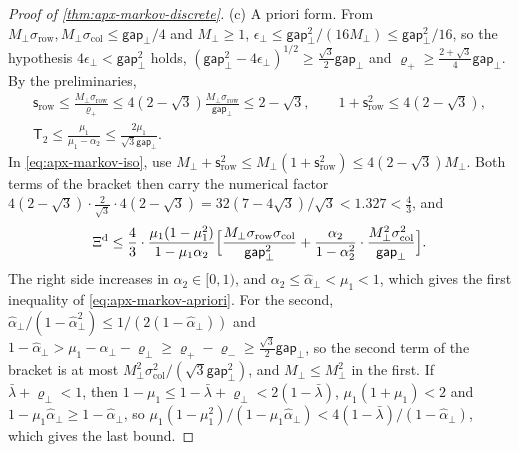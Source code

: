 \begin{proof}[Proof of \cref{thm:apx-markov-discrete}]
(c) A priori form. From $M_\perp\sigma_{\mathrm{row}},M_\perp\sigma_{\mathrm{col}}\le\mathsf{gap}_\perp/4$ and $M_\perp\ge1$, $\epsilon_\perp\le\mathsf{gap}_\perp^2/(16M_\perp)\le\mathsf{gap}_\perp^2/16$, so the hypothesis $4\epsilon_\perp<\mathsf{gap}_\perp^2$ holds, $(\mathsf{gap}_\perp^2-4\epsilon_\perp)^{1/2}\ge\frac{\sqrt3}2\mathsf{gap}_\perp$ and $\varrho_+\ge\frac{2+\sqrt3}4\mathsf{gap}_\perp$. By the preliminaries,
\begin{equation*}
\begin{gathered}
\mathsf s_{\mathrm{row}}\le\frac{M_\perp\sigma_{\mathrm{row}}}{\varrho_+}\le4(2-\sqrt3)\frac{M_\perp\sigma_{\mathrm{row}}}{\mathsf{gap}_\perp}\le2-\sqrt3,\qquad1+\mathsf s_{\mathrm{row}}^2\le4(2-\sqrt3),\\
\mathsf T_2\le\frac{\mu_1}{\mu_1-\alpha_2}\le\frac{2\mu_1}{\sqrt3\mathsf{gap}_\perp} .
\end{gathered}
\end{equation*}
In \eqref{eq:apx-markov-iso}, use $M_\perp+\mathsf s_{\mathrm{row}}^2\le M_\perp(1+\mathsf s_{\mathrm{row}}^2)\le4(2-\sqrt3)M_\perp$. Both terms of the bracket then carry the numerical factor $4(2-\sqrt3)\cdot\frac2{\sqrt3}\cdot4(2-\sqrt3)=32(7-4\sqrt3)/\sqrt3<1.327<\frac43$, and
\begin{equation*}
\Xi^{\mathrm d}\le\frac43\cdot\frac{\mu_1(1-\mu_1^2)}{1-\mu_1\alpha_2}\Bigl[\frac{M_\perp\sigma_{\mathrm{row}}\sigma_{\mathrm{col}}}{\mathsf{gap}_\perp^2}+\frac{\alpha_2}{1-\alpha_2^2}\cdot\frac{M_\perp^2\sigma_{\mathrm{col}}^2}{\mathsf{gap}_\perp}\Bigr].
\end{equation*}
The right side increases in $\alpha_2\in[0,1)$, and $\alpha_2\le\hat\alpha_\perp<\mu_1<1$, which gives the first inequality of \eqref{eq:apx-markov-apriori}. For the second, $\hat\alpha_\perp/(1-\hat\alpha_\perp^2)\le1/(2(1-\hat\alpha_\perp))$ and $1-\hat\alpha_\perp>\mu_1-\alpha_\perp-\varrho_\perp\ge\varrho_+-\varrho_-\ge\frac{\sqrt3}2\mathsf{gap}_\perp$, so the second term of the bracket is at most $M_\perp^2\sigma_{\mathrm{col}}^2/(\sqrt3\mathsf{gap}_\perp^2)$, and $M_\perp\le M_\perp^2$ in the first. If $\bar\lambda+\varrho_\perp<1$, then $1-\mu_1\le1-\bar\lambda+\varrho_\perp<2(1-\bar\lambda)$, $\mu_1(1+\mu_1)<2$ and $1-\mu_1\hat\alpha_\perp\ge1-\hat\alpha_\perp$, so $\mu_1(1-\mu_1^2)/(1-\mu_1\hat\alpha_\perp)<4(1-\bar\lambda)/(1-\hat\alpha_\perp)$, which gives the last bound.


\end{proof}
